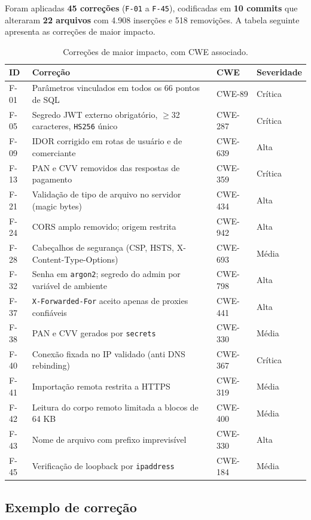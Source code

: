 \documentclass[12pt,a4paper]{article}
\begin{document}
Foram aplicadas \textbf{45 correções} (\texttt{F-01} a \texttt{F-45}), codificadas
em \textbf{10 commits} que alteraram \textbf{22 arquivos} com 4.908 inserções e
518 removições. A tabela seguinte apresenta as correções de maior impacto.

\begin{table}[H]
\centering
\caption{Correções de maior impacto, com CWE associado.}
\begin{tabularx}{\textwidth}{@{}lXll@{}}
\toprule
\textbf{ID} & \textbf{Correção} & \textbf{CWE} & \textbf{Severidade} \\
\midrule
F-01 & Parâmetros vinculados em todos os 66 pontos de SQL & CWE-89 & Crítica \\
F-05 & Segredo JWT externo obrigatório, $\geq$32 caracteres, \texttt{HS256} único & CWE-287 & Crítica \\
F-09 & IDOR corrigido em rotas de usuário e de comerciante & CWE-639 & Alta \\
F-13 & PAN e CVV removidos das respostas de pagamento & CWE-359 & Crítica \\
F-21 & Validação de tipo de arquivo no servidor (magic bytes) & CWE-434 & Alta \\
F-24 & CORS amplo removido; origem restrita & CWE-942 & Alta \\
F-28 & Cabeçalhos de segurança (CSP, HSTS, X-Content-Type-Options) & CWE-693 & Média \\
F-32 & Senha em \texttt{argon2}; segredo do admin por variável de ambiente & CWE-798 & Alta \\
F-37 & \texttt{X-Forwarded-For} aceito apenas de proxies confiáveis & CWE-441 & Alta \\
F-38 & PAN e CVV gerados por \texttt{secrets} & CWE-330 & Média \\
F-40 & Conexão fixada no IP validado (anti DNS rebinding) & CWE-367 & Crítica \\
F-41 & Importação remota restrita a HTTPS & CWE-319 & Média \\
F-42 & Leitura do corpo remoto limitada a blocos de 64 KB & CWE-400 & Média \\
F-43 & Nome de arquivo com prefixo imprevisível & CWE-330 & Alta \\
F-45 & Verificação de loopback por \texttt{ipaddress} & CWE-184 & Média \\
\bottomrule
\end{tabularx}
\end{table}

\subsection*{Exemplo de correção}
\end{document}
